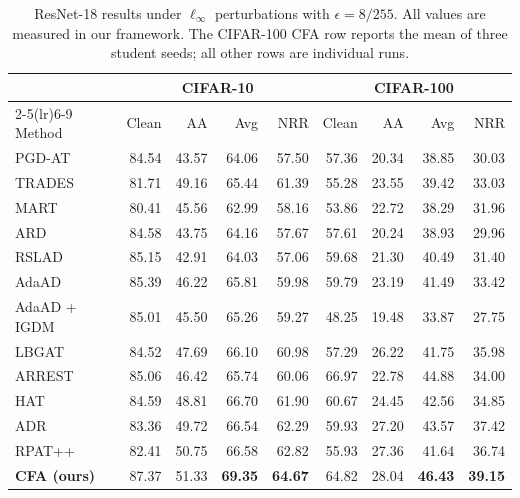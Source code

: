 \documentclass{article} %
\theoremstyle{plain}
\begin{document}
\begin{table}[!htbp]
  \centering
  \footnotesize
  \setlength{\tabcolsep}{3.2pt}
  \caption{
  ResNet-18 results under \(\ell_\infty\) perturbations with
  \(\epsilon=8/255\). All values are measured in our framework.
  The CIFAR-100 CFA row reports the mean of three student seeds;
  all other rows are individual runs.
  }
  \label{tab:main}
  \begin{tabular}{lrrrrrrrr}
    \toprule
    & \multicolumn{4}{c}{CIFAR-10}
      & \multicolumn{4}{c}{CIFAR-100} \\
    \cmidrule(lr){2-5}\cmidrule(lr){6-9}
    Method & Clean & AA & Avg & NRR
           & Clean & AA & Avg & NRR \\
    \midrule
    PGD-AT & 84.54 & 43.57 & 64.06 & 57.50
                 & 57.36 & 20.34 & 38.85 & 30.03 \\
    TRADES & 81.71 & 49.16 & 65.44 & 61.39
                 & 55.28 & 23.55 & 39.42 & 33.03 \\
    MART   & 80.41 & 45.56 & 62.99 & 58.16
                 & 53.86 & 22.72 & 38.29 & 31.96 \\
    \midrule
    ARD & 84.58 & 43.75 & 64.16 & 57.67
               & 57.61 & 20.24 & 38.93 & 29.96 \\
    RSLAD & 85.15 & 42.91 & 64.03 & 57.06
                 & 59.68 & 21.30 & 40.49 & 31.40 \\
    AdaAD & 85.39 & 46.22 & 65.81 & 59.98
                 & 59.79 & 23.19 & 41.49 & 33.42 \\
    AdaAD + IGDM & 85.01 & 45.50 & 65.26 & 59.27
                        & 48.25 & 19.48 & 33.87 & 27.75 \\
    LBGAT & 84.52 & 47.69 & 66.10 & 60.98
                 & 57.29 & 26.22 & 41.75 & 35.98 \\
    ARREST & 85.06 & 46.42 & 65.74 & 60.06
                  & 66.97 & 22.78 & 44.88 & 34.00 \\
    \midrule
    HAT & 84.59 & 48.81 & 66.70 & 61.90
               & 60.67 & 24.45 & 42.56 & 34.85 \\
    ADR & 83.36 & 49.72 & 66.54 & 62.29
               & 59.93 & 27.20 & 43.57 & 37.42 \\
    RPAT++ & 82.41 & 50.75 & 66.58 & 62.82
                  & 55.93 & 27.36 & 41.64 & 36.74 \\
    \midrule
    \textbf{CFA (ours)}
      & 87.37 & 51.33
      & \textbf{69.35} & \textbf{64.67}
      & 64.82 & 28.04
      & \textbf{46.43} & \textbf{39.15} \\
    \bottomrule
  \end{tabular}
\end{table}
\end{document}
